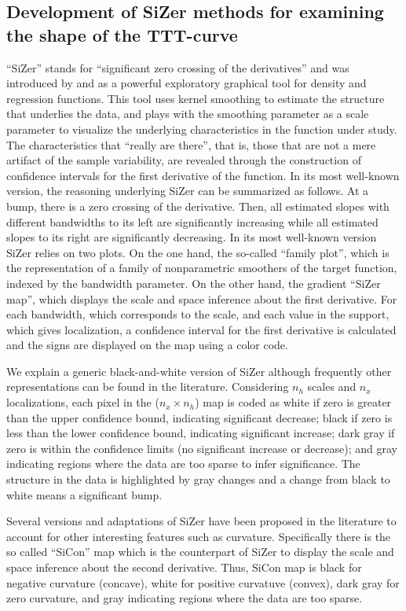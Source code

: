 \documentclass[preprint,12pt]{elsarticle}
\begin{document}
\subsection{Development of SiZer methods for examining the shape of the TTT-curve}
\noindent 
``SiZer'' stands for ``significant zero crossing of the derivatives'' and was introduced by \cite{CM99} and \cite{CM20} as a powerful exploratory graphical tool for density and regression functions. This tool uses kernel smoothing to estimate the structure that underlies the data, and plays with the smoothing parameter as a scale parameter to visualize the underlying characteristics in the function under study. The characteristics that ``really are there'', that is, those that are not a mere artifact of the sample variability, are revealed through the construction of confidence intervals for the first derivative of the function.
In its most well-known version, the reasoning underlying SiZer can be summarized as follows. At a bump, there is a zero crossing of the derivative. Then, all estimated slopes with different bandwidths to its left are significantly increasing while all estimated slopes to its right are significantly decreasing. In its most well-known version SiZer relies on two plots.
On the one hand, the so-called ``family plot'', which is the representation of a family of nonparametric smoothers of the target function, indexed by the bandwidth parameter. 
On the other hand, the gradient ``SiZer map'', which displays the scale and space inference about the first derivative. For each bandwidth, which corresponds to the scale,  and each value in the support, which gives localization, a confidence interval for the first derivative is calculated and the signs are displayed on the map using a color code. 

We explain a generic black-and-white version of SiZer although frequently other representations can be found in the literature.
Considering $n_h$ scales and $n_x$ localizations, each pixel in the ($n_x \times n_h$) map is coded as white if zero is greater than the upper confidence bound, indicating significant decrease;  black  if zero is less than the lower confidence bound, indicating significant increase; dark gray  if zero is within the confidence limits (no significant increase or decrease); and gray indicating regions where the data are too sparse to infer significance. 
The structure in the data is highlighted by gray changes and a change from black to white  means a significant bump. 

Several versions and adaptations of SiZer have been proposed in the literature to account for other interesting features such as curvature. Specifically there is the so called  ``SiCon'' map which is the counterpart of SiZer to display the scale and space inference about the second derivative. Thus, SiCon map is black for negative curvature (concave), white for positive curvatuve (convex), dark gray for zero curvature, and gray indicating regions where the data are too sparse. 
\end{document}
